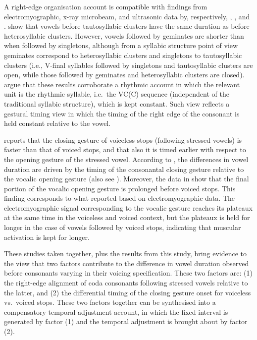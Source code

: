 \documentclass[preprint]{JASAnew}
\begin{document}
A right-edge organisation account is compatible with findings from
electromyographic, x-ray microbeam, and ultrasonic data by,
respectively, \citet{raphael1975}, \citet{de-jong1991}, and
\citet{celata2018}. \citet{celata2018} show that vowels before
tautosyllabic clusters have the same duration as before heterosyllabic
clusters. However, vowels followed by geminates are shorter than when
followed by singletons, although from a syllabic structure point of view
geminates correspond to heterosyllabic clusters and singletons to
tautosyllabic clusters (i.e., V-final syllables followed by singletons
and tautosyllabic clusters are open, while those followed by geminates
and heterosyllabic clusters are closed). \citet{celata2018} argue that
these results corroborate a rhythmic account in which the relevant unit
is the rhythmic syllable, i.e.~the VC(C) sequence (independent of the
traditional syllabic structure), which is kept constant. Such view
reflects a gestural timing view in which the timing of the right edge of
the consonant is held constant relative to the vowel.

\citet{de-jong1991} reports that the closing gesture of voiceless stops
(following stressed vowels) is faster than that of voiced stops, and
that also it is timed earlier with respect to the opening gesture of the
stressed vowel. According to \citet{de-jong1991}, the differences in
vowel duration are driven by the timing of the consonantal closing
gesture relative to the vocalic opening gesture (also see
\citealt{hertrich1997}). Moreover, the data in \citet{de-jong1991} show
that the final portion of the vocalic opening gesture is prolonged
before voiced stops. This finding corresponds to what
\citet{raphael1975} reported based on electromyographic data. The
electromyographic signal corresponding to the vocalic gesture reaches
its plateaux at the same time in the voiceless and voiced context, but
the plateaux is held for longer in the case of vowels followed by voiced
stops, indicating that muscular activation is kept for longer.

These studies taken together, plus the results from this study, bring
evidence to the view that two factors contribute to the difference in
vowel duration observed before consonants varying in their voicing
specification. These two factors are: (1) the right-edge alignment of
coda consonants following stressed vowels relative to the latter, and
(2) the differential timing of the closing gesture onset for voiceless
vs.~voiced stops. These two factors together can be synthesised into a
compensatory temporal adjustment account, in which the fixed interval is
generated by factor (1) and the temporal adjustment is brought about by
factor (2).
\end{document}
